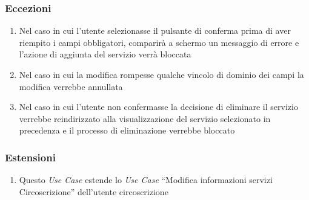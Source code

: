         \subsubsection{Eccezioni}
            \begin{enumerate}
                \item Nel caso in cui l'utente selezionasse il pulsante di conferma prima di aver riempito i campi obbligatori, comparirà a schermo un messaggio di errore e l'azione di aggiunta del servizio verrà bloccata
                \item Nel caso in cui la modifica rompesse qualche vincolo di dominio dei campi la modifica verrebbe annullata
                \item Nel caso in cui l'utente non confermasse la decisione di eliminare il servizio verrebbe reindirizzato alla visualizzazione del servizio selezionato in precedenza e il processo di eliminazione verrebbe bloccato
            \end{enumerate}
        \subsubsection{Estensioni}
            \begin{enumerate}
                \item Questo \textit{Use Case} estende lo \textit{Use Case} ``Modifica informazioni servizi Circoscrizione'' dell'utente circoscrizione
            \end{enumerate}
